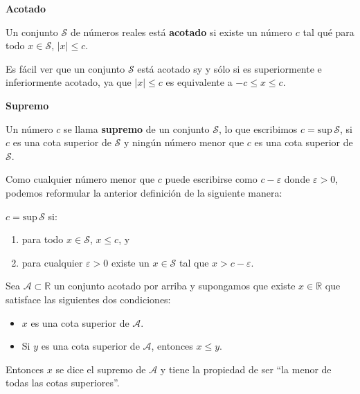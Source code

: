 \vspace{0.21cm}
\begin{tcolorbox}
	\begin{defi}\textbf{Acotado}\end{defi}
	Un conjunto $\mathcal{S}$ de números reales está \textbf{acotado}  si existe un número $c$ tal qué para todo $x \in \mathcal{S}$, $|x| \leq c$.
	
	Es fácil ver que un conjunto $\mathcal{S}$ está acotado sy y sólo si es superiormente e inferiormente acotado, ya que $|x| \leq c$ es equivalente a $-c \leq x \leq c$.
\end{tcolorbox}

\vspace{0.21cm}
\begin{tcolorbox}
	\begin{defi}\textbf{Supremo}\end{defi}
	Un número $c$ se llama \textbf{supremo} de un conjunto $\mathcal{S}$, lo que escribimos $c = \mathrm{sup}\, \mathcal{S}$, si $c$ es una cota superior de $\mathcal{S}$ y ningún número menor que $c$ es una cota superior de $\mathcal{S}$.
	
	Como cualquier número menor que $c$ puede escribirse como $c-\varepsilon$  donde $\varepsilon > 0$, podemos reformular la anterior definición de la siguiente manera:
	
	\vspace{0.35cm}
	$c = \mathrm{sup} \,\mathcal{S}$ si:
	
	\begin{enumerate}
		\item para todo $x \in \mathcal{S}$, $x \leq c$, y
		\item para cualquier $\varepsilon > 0$ existe un $x \in \mathcal{S}$ tal que $x > c - \varepsilon$. \cite{haaser}
	\end{enumerate}
	
	
	Sea $\mathcal{A} \subset \mathbb{R}$ un conjunto acotado por arriba y supongamos que existe $x\in \mathbb{R}$ que satisface las siguientes dos condiciones:
	
	\begin{itemize}
		\item $x$ es una cota superior de $\mathcal{A}$.
		\item Si $y$ es una cota superior de $\mathcal{A}$, entonces $x \leq y$.
	\end{itemize}
	Entonces $x$ se dice el supremo de $\mathcal{A}$ y tiene la propiedad de ser “la menor de todas las cotas superiores”. \cite{zill}
\end{tcolorbox}
		



